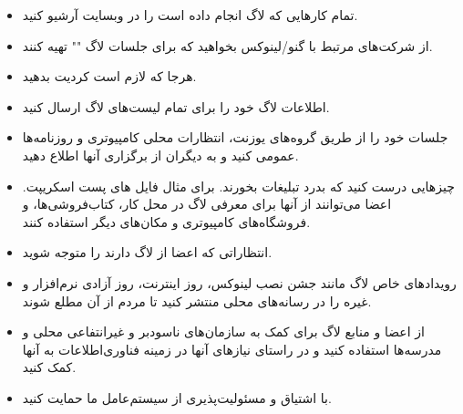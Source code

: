 \begin{itemize}
\item
تمام کارهایی که لاگ انجام داده است را در وبسایت آرشیو کنید.
\item
از شرکت‌های مرتبط با گنو/لینوکس بخواهید که برای جلسات لاگ
""
تهیه کنند.
\item
هرجا که لازم است کردیت بدهید.
\item
اطلاعات لاگ خود را برای تمام لیست‌های لاگ ارسال کنید.
\item
جلسات‌ خود را از طریق گروه‌های یوزنت، انتظارات محلی کامپیوتری و روزنامه‌ها
عمومی کنید و به دیگران از برگزاری آنها اطلاع دهید.
\item
چیزهایی درست کنید که بدرد تبلیغات بخورند. برای مثال فایل های پست اسکریپت.
اعضا می‌توانند از آنها برای معرفی لاگ در محل کار، کتاب‌فروشی‌ها، و فروشگاه‌های کامپیوتری
و مکان‌های دیگر استفاده کنند.
\item
انتظاراتی که اعضا از لاگ دارند را متوجه شوید.
\item
رویدادهای خاص لاگ مانند جشن نصب لینوکس، روز اینترنت، روز آزادی نرم‌افزار
و غیره را در رسانه‌های محلی منتشر کنید تا مردم از آن مطلع شوند.
\item
از اعضا و منابع لاگ برای کمک به سازمان‌های ناسودبر و غیرانتفاعی محلی
و مدرسه‌ها استفاده کنید و در راستای نیازهای آنها در زمینه فناوری‌اطلاعات
به آنها کمک کنید.
\item
با اشتیاق و مسئولیت‌پذیری از سیستم‌عامل ما حمایت کنید.

\end{itemize}
